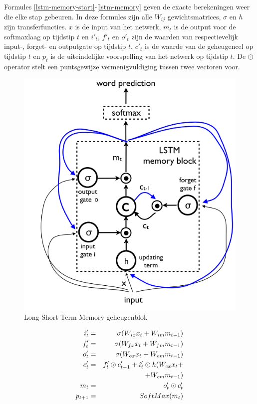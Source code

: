 Formules \eqref{lstm-memory-start}-\eqref{lstm-memory} geven de exacte berekeningen weer die elke stap gebeuren. In deze formules zijn alle $W_{ij}$ gewichtsmatrices, $\sigma$ en $h$ zijn transferfuncties. $x$ is de input van het netwerk, $m_t$ is de output voor de softmaxlaag op tijdstip $t$ en $i'_t$, $f'_t$ en $o'_t$ zijn de waarden van respectievelijk input-, forget- en outputgate op tijdstip $t$. $c'_t$ is de waarde van de geheugencel op tijdstip $t$ en $p_t$ is de uiteindelijke voorspelling van het netwerk op tijdstip $t$. De $\odot$ operator stelt een puntsgewijze vermenigvuldiging tussen twee vectoren voor.


\begin{figure}[tb]
    \centering
    \includegraphics[width=\linewidth]{Images/lstm.PNG}
    \caption{Long Short Term Memory geheugenblok}
    \label{fig:lstm}
\end{figure}

\begin{eqnarray}
\vspace{-3mm}
\label{lstm-memory-start}
i_t' & = & \sigma (W_{ix} x_t + W_{im} m_{t-1}) \label{lstm-input} \\
f_t' & = & \sigma (W_{fx} x_t + W_{fm} m_{t-1}) \\
o_t' & = & \sigma (W_{ox} x_t + W_{om} m_{t-1}) \\
c_t' & = & f_t' \odot c_{t-1}' + i_t' \odot h(W_{cx} x_t + \nonumber \\
&   & + W_{cm} m_{t-1}) \\
m_t & = & o_t' \odot c_t'\\
p_{t+1} & = & SoftMax(m_t)
\label{lstm-memory}
\vspace{-3mm}
\end{eqnarray}

